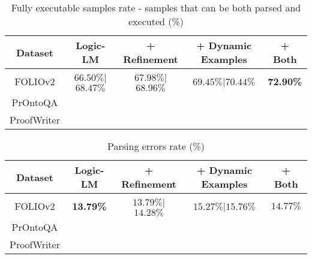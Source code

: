 \documentclass[conference]{IEEEtran}
\begin{document}
\begin{table*}[t]
    \centering
    \begin{tabular}{|c|c|c|c|c|}
    \hline
    \textbf{Dataset}                    & \textbf{Logic-LM}             & \textbf{+ Refinement}         & \textbf{+ Dynamic Examples}         & \textbf{+ Both}           \\ \hline
    FOLIOv2                             &  $66.50\%$|$68.47\%$          &     $67.98\%$|$68.96\%$       &      $69.45\%$|$70.44\%$          &     \textbf{72.90\%}    \\ \hline
    PrOntoQA                            &                               &                               &                                   &         \\ \hline
    ProofWriter                         &                               &                               &                                   &         \\ \hline
    \end{tabular}
\caption{Fully executable samples rate - samples that can be both parsed and executed (\%)}    
\end{table*}

\begin{table*}[t]
    \centering
    \begin{tabular}{|c|c|c|c|c|}
    \hline
    \textbf{Dataset}                    & \textbf{Logic-LM}     & \textbf{+ Refinement}         & \textbf{+ Dynamic Examples}       & \textbf{+ Both}                \\ \hline
    FOLIOv2                             &  \textbf{13.79\%}     &     $13.79\%$|$14.28\%$       &      $15.27\%$|$15.76\%$          &     $14.77\%$                  \\ \hline
    PrOntoQA                            &                       &                               &                                   &                                \\ \hline
    ProofWriter                         &                       &                               &                                   &                                \\ \hline
    \end{tabular}
\caption{Parsing errors rate (\%)}    
\end{table*}
\end{document}

